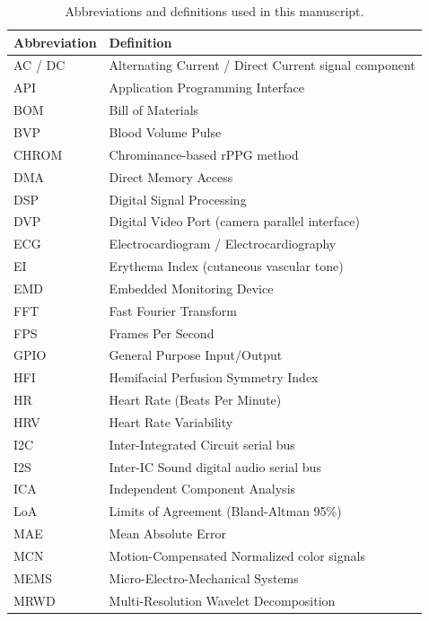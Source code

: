 \documentclass[journal]{IEEEtran}
\begin{document}
\begin{table}[!t]
    \centering
    \caption{Abbreviations and definitions used in this manuscript.}
    \label{tab:abbreviations}
    \renewcommand{\arraystretch}{1.06}
    \setlength{\tabcolsep}{4.0pt}
    \begin{tabular}{ll}
        \toprule
        \textbf{Abbreviation} & \textbf{Definition} \\
        \midrule
        AC / DC & Alternating Current / Direct Current signal component \\
        API & Application Programming Interface \\
        BOM & Bill of Materials \\
        BVP & Blood Volume Pulse \\
        CHROM & Chrominance-based rPPG method \\
        DMA & Direct Memory Access \\
        DSP & Digital Signal Processing \\
        DVP & Digital Video Port (camera parallel interface) \\
        ECG & Electrocardiogram / Electrocardiography \\
        EI & Erythema Index (cutaneous vascular tone) \\
        EMD & Embedded Monitoring Device \\
        FFT & Fast Fourier Transform \\
        FPS & Frames Per Second \\
        GPIO & General Purpose Input/Output \\
        HFI & Hemifacial Perfusion Symmetry Index \\
        HR & Heart Rate (Beats Per Minute) \\
        HRV & Heart Rate Variability \\
        I2C & Inter-Integrated Circuit serial bus \\
        I2S & Inter-IC Sound digital audio serial bus \\
        ICA & Independent Component Analysis \\
        LoA & Limits of Agreement (Bland-Altman 95\%) \\
        MAE & Mean Absolute Error \\
        MCN & Motion-Compensated Normalized color signals \\
        MEMS & Micro-Electro-Mechanical Systems \\
        MRWD & Multi-Resolution Wavelet Decomposition \\

\end{tabular}
\end{table}
\end{document}

